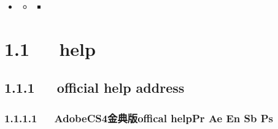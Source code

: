 \documentclass[letterpaper,12pt,english]{sphinxmanual}
\begin{document}
\begin{sphinxShadowBox}
\begin{itemize}
\begin{itemize}
\begin{itemize}
\item {} 
\label{\detokenize{001software/001install/adobe:id25}}{\hyperref[\detokenize{001software/001install/adobe:id3}]{}}

\item {} 
\label{\detokenize{001software/001install/adobe:id26}}{\hyperref[\detokenize{001software/001install/adobe:id4}]{}}

\end{itemize}

\item {} 
\label{\detokenize{001software/001install/adobe:id27}}{\hyperref[\detokenize{001software/001install/adobe:premiere-pro-cs4}]{}}
\begin{itemize}
\item {} 
\label{\detokenize{001software/001install/adobe:id28}}{\hyperref[\detokenize{001software/001install/adobe:tips}]{}}
\begin{itemize}
\item {} 
\label{\detokenize{001software/001install/adobe:id29}}{\hyperref[\detokenize{001software/001install/adobe:id5}]{}}

\end{itemize}

\end{itemize}

\end{itemize}

\end{itemize}
\end{sphinxShadowBox}


\section{1.1   help}
\label{\detokenize{001software/001install/adobe:help}}

\subsection{1.1.1   official help address}
\label{\detokenize{001software/001install/adobe:official-help-address}}

\subsubsection{1.1.1.1   AdobeCS4金典版\sphinxhyphen{}offical help\sphinxhyphen{}Pr Ae En Sb Ps}
\label{\detokenize{001software/001install/adobe:adobecs4-offical-help-pr-ae-en-sb-ps}}
\end{document}
